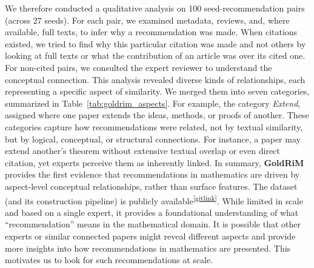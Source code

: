 \documentclass[sigconf,anonymous]{acmart}
\begin{document}
We therefore conducted a qualitative analysis on 100 seed-recommendation pairs (across 27 seeds).
For each pair, we examined metadata, reviews, and, where available, full texts, to infer why a recommendation was made.
When citations existed, we tried to find why this particular citation was made and not others by looking at full texts or what the contribution of an article was over its cited one.
For non-cited pairs, we consulted the expert reviewer to understand the conceptual connection.
This analysis revealed diverse kinds of relationships, each representing a specific aspect of similarity.
We merged them into seven categories, summarized in Table~\ref{tab:goldrim_aspects}.
For example, the category \textit{Extend}, assigned where one paper extends the ideas, methods, or proofs of another.
These categories capture how recommendations were related, not by textual similarity, but by logical, conceptual, or structural connections.
For instance, a paper may extend another’s theorem without extensive textual overlap or even direct citation, yet experts perceive them as inherently linked.
In summary, \textbf{GoldRiM} provides the first evidence that recommendations in mathematics are driven by aspect-level conceptual relationships, rather than surface features.
The dataset (and its construction pipeline) is publicly available\textsuperscript{\ref{gitlink}}.
While limited in scale and based on a single expert, it provides a foundational understanding of what “recommendation” means in the mathematical domain.
It is possible that other experts or similar connected papers might reveal different aspects and provide more insights into how recommendations in mathematics are presented.
This motivates us to look for such recommendations at scale.
\end{document}
